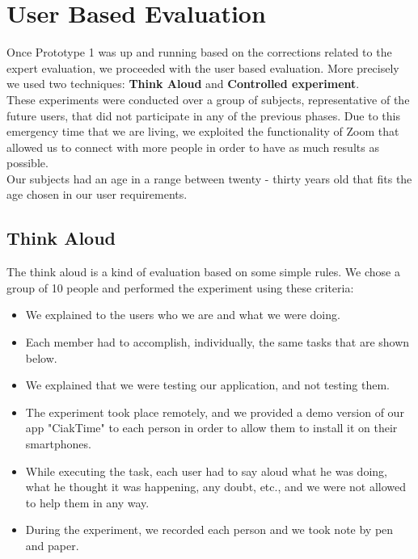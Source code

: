 \documentclass[12pt, a4paper]{article}
\numberwithin{figure}{section}
\begin{document}

\newpage

\section{User Based Evaluation}

Once Prototype 1 was up and running based on the corrections related to the expert evaluation, we 
proceeded with the user based evaluation. More precisely we used two techniques: \textbf{Think Aloud} and 
\textbf{Controlled experiment}.\\ These experiments were conducted over a group of subjects, representative 
of the future users, that did not participate in any of the previous phases.
Due to this emergency time that we are living, we exploited the functionality of Zoom that allowed us 
to connect with more people in order to have as much results as possible.\\
Our subjects had an age in a range between twenty - thirty years old that fits the age chosen in our user requirements.

\subsection{Think Aloud}

The think aloud is a kind of evaluation based on some simple rules. We chose a group of 10 people and 
performed the experiment using these criteria:
\begin{itemize}
	\item We explained to the users who we are and what we were doing.
	\item Each member had to accomplish, individually, the same tasks that are shown below.
	\item We explained that we were testing our application, and not testing them.
	\item The experiment took place remotely, and we provided a demo version of our app "CiakTime" to each person in order to allow them to install it on their smartphones.
	\item While executing the task, each user had to say aloud what he was doing, what he thought it was happening, any doubt, etc., and we were not allowed to help them in any way.
	\item During the experiment, we recorded each person and we took note by pen and paper.
\end{itemize}
\end{document}
